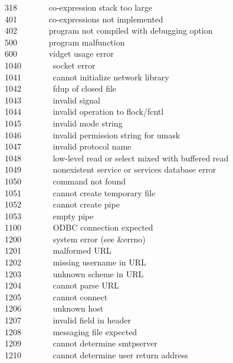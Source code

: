 318 \ \ \ \ \ \ \ co-expression stack too large\\
401 \ \ \ \ \ \ \ co-expressions not implemented\\
402 \ \ \ \ \ \ \ program not compiled with debugging option\\
500 \ \ \ \ \ \ \ program malfunction\\
600 \ \ \ \ \ \ \ vidget usage error\\
1040 \ \ \ \ \ \ \ socket error \\
1041 \ \ \ \ \ \ \ cannot initialize network library \\
1042 \ \ \ \ \ \ \ fdup of closed file \\
1043 \ \ \ \ \ \ \ invalid signal \\
1044 \ \ \ \ \ \ \ invalid operation to flock/fcntl\\
1045 \ \ \ \ \ \ \ invalid mode string\\
1046 \ \ \ \ \ \ \ invalid permission string for umask\\
1047 \ \ \ \ \ \ \ invalid protocol name\\
1048 \ \ \ \ \ \ \ low-level read or select mixed with buffered read\\
1049 \ \ \ \ \ \ \ nonexistent service or services database error\\
1050 \ \ \ \ \ \ \ command not found\\
1051 \ \ \ \ \ \ \ cannot create temporary file\\
1052 \ \ \ \ \ \ \ cannot create pipe\\
1053 \ \ \ \ \ \ \ empty pipe\\
1100 \ \ \ \ \ \ \ ODBC connection expected\\
1200 \ \ \ \ \ \ \ system error (see \&errno)\\
1201 \ \ \ \ \ \ \ malformed URL\\
1202 \ \ \ \ \ \ \ missing username in URL\\
1203 \ \ \ \ \ \ \ unknown scheme in URL\\
1204 \ \ \ \ \ \ \ cannot parse URL\\
1205 \ \ \ \ \ \ \ cannot connect\\
1206 \ \ \ \ \ \ \ unknown host\\
1207 \ \ \ \ \ \ \ invalid field in header\\
1208 \ \ \ \ \ \ \ messaging file expected\\
1209 \ \ \ \ \ \ \ cannot determine smtpserver\\
1210 \ \ \ \ \ \ \ cannot determine user return address\\
